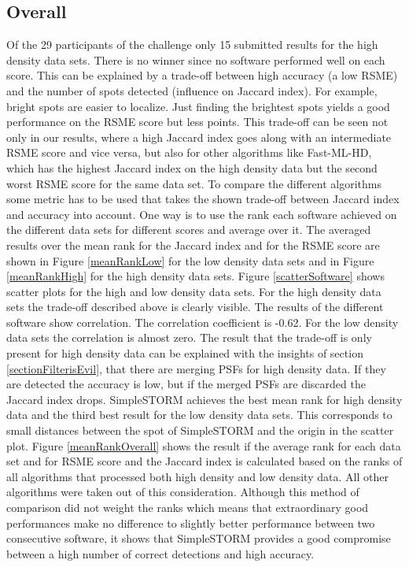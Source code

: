 \subsection{Overall}
Of the 29 participants of the challenge only 15 submitted results for the high density data sets. There is no winner since no software performed well on each score. This can be explained by a trade-off between high accuracy (a low RSME) and the number of spots detected (influence on Jaccard index). For example, bright spots are easier to localize. Just finding the brightest spots yields a good performance on the RSME score but less points. This trade-off can be seen not only in our results, where a high Jaccard index goes along with an intermediate RSME score and vice versa, but also for other algorithms like Fast-ML-HD, which has the highest Jaccard index on the high density data but the second worst RSME score for the same data set.\newline
To compare the different algorithms some metric has to be used that takes the shown trade-off between Jaccard index and accuracy into account. One way is to use the rank each software achieved on the different data sets for different scores and average over it. The averaged results over the mean rank for the Jaccard index and for the RSME score are shown in Figure \ref{meanRankLow} for the low density data sets and in Figure \ref{meanRankHigh} for the high density data sets. Figure \ref{scatterSoftware} shows scatter plots for the high and low density data sets. For the high density data sets the trade-off described above is clearly visible. The results of the different software show correlation. The correlation coefficient is -0.62. For the low density data sets the correlation is almost zero. The result that the trade-off is only present for high density data can be explained with the insights of section \ref{sectionFilterisEvil}, that there are merging PSFs for high density data. If they are detected the accuracy is low, but if the merged PSFs are discarded the Jaccard index drops.\newline
SimpleSTORM achieves the best mean rank for high density data and the third best result for the low density data sets. This corresponds to small distances between the spot of SimpleSTORM and the origin in the scatter plot.\newline
Figure \ref{meanRankOverall} shows the result if the average rank for each data set and for RSME score and the Jaccard index is calculated based on the ranks of all algorithms that processed both high density and low density data. All other algorithms were taken out of this consideration. Although this method of comparison did not weight the ranks which means that extraordinary good performances make no difference to slightly better performance between two consecutive software, it shows that SimpleSTORM provides a good compromise between a high number of correct detections and high accuracy.

